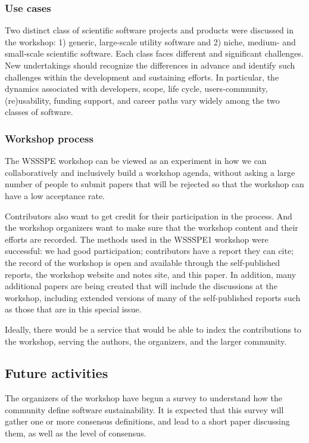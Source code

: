 \documentclass[11pt, oneside]{amsart}
\begin{document}
\subsubsection*{Use cases}
Two distinct class of scientific software projects and products were
discussed in the workshop: 1) generic, large-scale utility software
and 2) niche, medium- and small-scale scientific software. Each class
faces different and significant challenges. New undertakings should
recognize the differences in advance and identify such challenges
within the development and sustaining efforts. In particular, the
dynamics associated with developers, scope, life cycle,
users-community, (re)usability, funding support, and career paths vary
widely among the two classes of software.


\subsubsection*{Workshop process}
The WSSSPE workshop can be viewed as an experiment in how we can
collaboratively and inclusively build a workshop agenda, without
asking a large number of people to submit papers that will be rejected
so that the workshop can have a low acceptance rate.

Contributors also want to get credit for their participation in the
process.  And the workshop organizers want to make sure that the
workshop content and their efforts are recorded.  The methods used in
the WSSSPE1 workshop were successful: we had good participation;  
contributors have a report they can cite;   the record of the
workshop is open and available through the self-published reports,
the workshop website and notes site, and this paper.  In addition,
many additional papers are being created that will include the
discussions at the workshop, including extended versions of many of
the self-published reports such as those that are in this special
issue.

Ideally, there would be a service that would be able to index the
contributions to the workshop, serving the authors, the organizers,
and the larger community.

\subsection{Future activities} \label{sec:future}

The organizers of the workshop have begun a survey to understand how
the community define software sustainability.  It is expected that
this survey will gather one or more consensus definitions, and lead to
a short paper discussing them, as well as the level of consensus.
\end{document}
